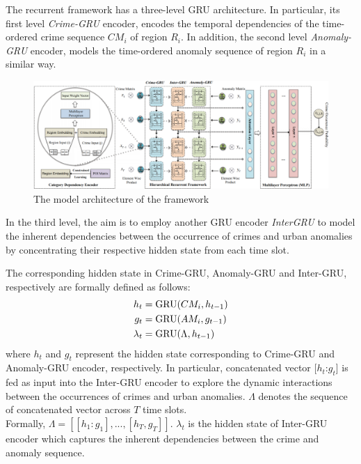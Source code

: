 The recurrent framework has a three-level GRU architecture. In
particular, its first level \emph{Crime-GRU} encoder, encodes the temporal
dependencies of the time-ordered crime sequence $CM_i$ of region $R_i$. In addition, the second level \emph{Anomaly-GRU} encoder, models the
time-ordered anomaly sequence of region $R_i$ in a similar way.
\begin{figure}[t]
	\begin{center}
	\includegraphics[width=.95\textwidth]{Chapter3/Plots_Chapter3/framework.png}
	\caption{The model architecture of the framework}
	\label{fig:framework}
	\end{center}
\end{figure}

In the third level, the aim is to employ another GRU encoder \emph{InterGRU} to model the inherent dependencies between the occurrence
of crimes and urban anomalies by concentrating their respective
hidden state from each time slot.

The corresponding hidden state in Crime-GRU, Anomaly-GRU and Inter-GRU, respectively are formally defined as follows:
\begin{align}
    h_t     &=      \text{GRU}(CM_i,h_{t-1})\notag\\
    g_t     &=      \text{GRU}(AM_i,g_{t-1})\notag\\
    \lambda_t &=    \text{GRU}(\Lambda,h_{t-1})
\end{align}
where $h_t$ and $g_t$ represent the hidden state corresponding to Crime-GRU and 
Anomaly-GRU encoder, respectively. In particular, 
concatenated vector [$h_t$:$g_t$] is fed as input into the Inter-GRU encoder to explore the dynamic interactions between the occurrences of crimes and urban anomalies. $\Lambda$ denotes the sequence of concatenated vector across $T$ time slots. \\Formally, $\Lambda = [[h_1:g_1],...,[h_T,g_T]]$. $\lambda_t$ is the hidden state of Inter-GRU encoder which captures the inherent dependencies between the crime and anomaly sequence.

